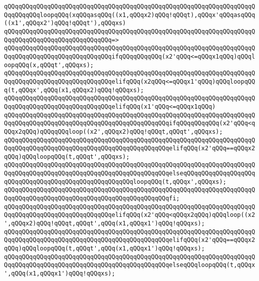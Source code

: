 \newline
\verb|qQQqqQQqqQQqqQQqqQQqqQQqqQQqqQQqqQQqqQQqqQQqqQQqqQQqqQQqqQQqqQQqqQQqqQQqqQQqqQQqloopqQQq(xqQQqasqQQq((x1,qQQqx2)qQQq!qQQqt),qQQqx'qQQqasqQQq((x1',qQQqx2')qQQq!qQQqt'),qQQqxs)|\newline
\verb|qQQqqQQqqQQqqQQqqQQqqQQqqQQqqQQqqQQqqQQqqQQqqQQqqQQqqQQqqQQqqQQqqQQqqQQqqQQqqQQqqQQqqQQqqQQqqQQqqQQq=>|\newline
\verb|qQQqqQQqqQQqqQQqqQQqqQQqqQQqqQQqqQQqqQQqqQQqqQQqqQQqqQQqqQQqqQQqqQQqqQQqqQQqqQQqqQQqqQQqqQQqqQQqqQQqifqQQqqQQqqQQq(x2'qQQq<=qQQqx1qQQq)qQQqloopqQQq(x,qQQqt',qQQqxs);|\newline
\verb|qQQqqQQqqQQqqQQqqQQqqQQqqQQqqQQqqQQqqQQqqQQqqQQqqQQqqQQqqQQqqQQqqQQqqQQqqQQqqQQqqQQqqQQqqQQqqQQqqQQqelifqQQq(x2qQQq<=qQQqx1'qQQq)qQQqloopqQQq(t,qQQqx',qQQq(x1,qQQqx2)qQQq!qQQqxs);|\newline
\verb|qQQqqQQqqQQqqQQqqQQqqQQqqQQqqQQqqQQqqQQqqQQqqQQqqQQqqQQqqQQqqQQqqQQqqQQqqQQqqQQqqQQqqQQqqQQqqQQqqQQqelifqQQq(x1'qQQq<=qQQqx1qQQq)|\newline
\verb|qQQqqQQqqQQqqQQqqQQqqQQqqQQqqQQqqQQqqQQqqQQqqQQqqQQqqQQqqQQqqQQqqQQqqQQqqQQqqQQqqQQqqQQqqQQqqQQqqQQqqQQqqQQqqQQqqQQqifqQQqqQQqqQQq(x2'qQQq<qQQqx2qQQq)qQQqqQQqloop((x2',qQQqx2)qQQq!qQQqt,qQQqt',qQQqxs);|\newline
\verb|qQQqqQQqqQQqqQQqqQQqqQQqqQQqqQQqqQQqqQQqqQQqqQQqqQQqqQQqqQQqqQQqqQQqqQQqqQQqqQQqqQQqqQQqqQQqqQQqqQQqqQQqqQQqqQQqqQQqelifqQQq(x2'qQQq==qQQqx2qQQq)qQQqloopqQQq(t,qQQqt',qQQqxs);|\newline
\verb|qQQqqQQqqQQqqQQqqQQqqQQqqQQqqQQqqQQqqQQqqQQqqQQqqQQqqQQqqQQqqQQqqQQqqQQqqQQqqQQqqQQqqQQqqQQqqQQqqQQqqQQqqQQqqQQqqQQqelseqQQqqQQqqQQqqQQqqQQqqQQqqQQqqQQqqQQqqQQqqQQqqQQqqQQqqQQqloopqQQq(t,qQQqx',qQQqxs);|\newline
\verb|qQQqqQQqqQQqqQQqqQQqqQQqqQQqqQQqqQQqqQQqqQQqqQQqqQQqqQQqqQQqqQQqqQQqqQQqqQQqqQQqqQQqqQQqqQQqqQQqqQQqqQQqqQQqqQQqqQQqfi;|\newline
\verb|qQQqqQQqqQQqqQQqqQQqqQQqqQQqqQQqqQQqqQQqqQQqqQQqqQQqqQQqqQQqqQQqqQQqqQQqqQQqqQQqqQQqqQQqqQQqqQQqqQQqelifqQQq(x2'qQQq<qQQqx2qQQq)qQQqloop((x2',qQQqx2)qQQq!qQQqt,qQQqt',qQQq(x1,qQQqx1')qQQq!qQQqxs);|\newline
\verb|qQQqqQQqqQQqqQQqqQQqqQQqqQQqqQQqqQQqqQQqqQQqqQQqqQQqqQQqqQQqqQQqqQQqqQQqqQQqqQQqqQQqqQQqqQQqqQQqqQQqqQQqqQQqqQQqqQQqelifqQQq(x2'qQQq==qQQqx2qQQq)qQQqloopqQQq(t,qQQqt',qQQq(x1,qQQqx1')qQQq!qQQqxs);|\newline
\verb|qQQqqQQqqQQqqQQqqQQqqQQqqQQqqQQqqQQqqQQqqQQqqQQqqQQqqQQqqQQqqQQqqQQqqQQqqQQqqQQqqQQqqQQqqQQqqQQqqQQqqQQqqQQqqQQqqQQqelseqQQqloopqQQq(t,qQQqx',qQQq(x1,qQQqx1')qQQq!qQQqxs);|\newline

